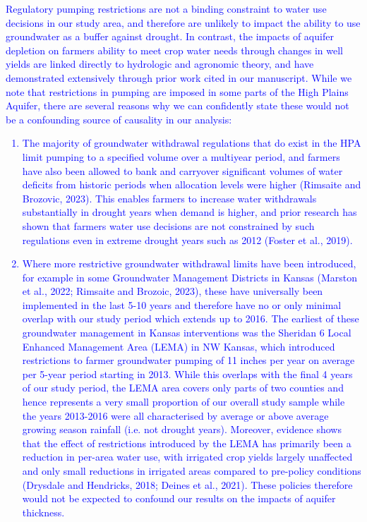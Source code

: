 \documentclass[
]{article}
\begin{document}
\begin{itemize}
\begin{itemize}
  \textcolor{blue}{Regulatory pumping restrictions are not a binding constraint to water use decisions in our study area, and therefore are unlikely to impact the ability to use groundwater as a buffer against drought. In contrast, the impacts of aquifer depletion on farmers ability to meet crop water needs through changes in well yields are linked directly to hydrologic and agronomic theory, and have demonstrated extensively through prior work cited in our manuscript. While we note that restrictions in pumping are imposed in some parts of the High Plains Aquifer, there are several reasons why we can confidently state these would not be a confounding source of causality in our analysis:
  \begin{enumerate}
      \item The majority of groundwater withdrawal regulations that do exist in the HPA limit pumping to a specified volume over a multiyear period, and farmers have also been allowed to bank and carryover significant volumes of water deficits from historic periods when allocation levels were higher (Rimsaite and Brozovic, 2023). This enables farmers to increase water withdrawals substantially in drought years when demand is higher, and prior research has shown that farmers water use decisions are not constrained by such regulations even in extreme drought years such as 2012 (Foster et al., 2019).
      \item Where more restrictive groundwater withdrawal limits have been introduced, for example in some Groundwater Management Districts in Kansas (Marston et al., 2022; Rimsaite and Brozoic, 2023), these have universally been implemented in the last 5-10 years and therefore have no or only minimal overlap with our study period which extends up to 2016. The earliest of these groundwater management in Kansas interventions was the Sheridan 6 Local Enhanced Management Area (LEMA) in NW Kansas, which introduced restrictions to farmer groundwater pumping of 11 inches per year on average per 5-year period starting in 2013. While this overlaps with the final 4 years of our study period, the LEMA area covers only parts of two counties and hence represents a very small proportion of our overall study sample while the years 2013-2016 were all characterised by average or above average growing season rainfall (i.e. not drought years). Moreover, evidence shows that the effect of restrictions introduced by the LEMA has primarily been a reduction in per-area water use, with irrigated crop yields largely unaffected and only small reductions in irrigated areas compared to pre-policy conditions (Drysdale and Hendricks, 2018; Deines et al., 2021). These policies therefore would not be expected to confound our results on the impacts of aquifer thickness. 

\end{enumerate}}
\end{itemize}
\end{itemize}
\end{document}
